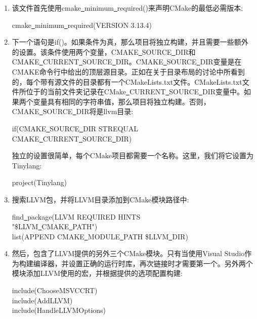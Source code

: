 \begin{enumerate}
	\item 该文件首先使用cmake\underline{~}minimum\underline{~}required()来声明CMake的最低必需版本:
	\begin{tcolorbox}[colback=white,colframe=black]
		cmake\underline{~}minimum\underline{~}required(VERSION 3.13.4)
	\end{tcolorbox}
 	\item 下一个语句是if()。如果条件为真，那么项目将独立构建，并且需要一些额外的设置。该条件使用两个变量，CMAKE\underline{~}SOURCE\underline{~}DIR和CMAKE\underline{~}CURRENT\underline{~}SOURCE\underline{~}DIR。CMAKE\underline{~}SOURC\allowbreak E\underline{~}DIR变量是在CMAKE命令行中给出的顶层源目录。正如在关于目录布局的讨论中所看到的，每个带有源文件的目录都有一个CMakeLists.txt文件。CMakeLists.txt文件所位于的当前文件夹记录在CMake\underline{~}CURRENT\underline{~}SOURCE\underline{~}DIR变量中。如果两个变量具有相同的字符串值，那么项目将独立构建。否则，CMAKE\underline{~}SOURCE\underline{~}DIR将是llvm目录:
 	\begin{tcolorbox}[colback=white,colframe=black]
 		if(CMAKE\underline{~}SOURCE\underline{~}DIR STREQUAL CMAKE\underline{~}CURRENT\underline{~}SOURCE\underline{~}DIR)
 	\end{tcolorbox}
 	独立的设置很简单，每个CMake项目都需要一个名称。这里，我们将它设置为Tinylang:
 	\begin{tcolorbox}[colback=white,colframe=black]
 		project(Tinylang)
 	\end{tcolorbox}
 	\item 搜索LLVM包，并将LLVM目录添加到CMake模块路径中:
 	\begin{tcolorbox}[colback=white,colframe=black]
 		find\underline{~}package(LLVM REQUIRED HINTS \\
 		"\${LLVM\underline{~}CMAKE\underline{~}PATH}") \\
 		list(APPEND CMAKE\underline{~}MODULE\underline{~}PATH \${LLVM\underline{~}DIR})
 	\end{tcolorbox}
 	\item 然后，包含了LLVM提供的另外三个CMake模块。只有当使用Visual Studio作为构建编译器，并设置正确的运行时库，再次链接时才需要第一个。另外两个模块添加LLVM使用的宏，并根据提供的选项配置构建:
 	\begin{tcolorbox}[colback=white,colframe=black]
 		include(ChooseMSVCCRT) \\
 		include(AddLLVM) \\
 		include(HandleLLVMOptions)
 	\end{tcolorbox}

\end{enumerate}
